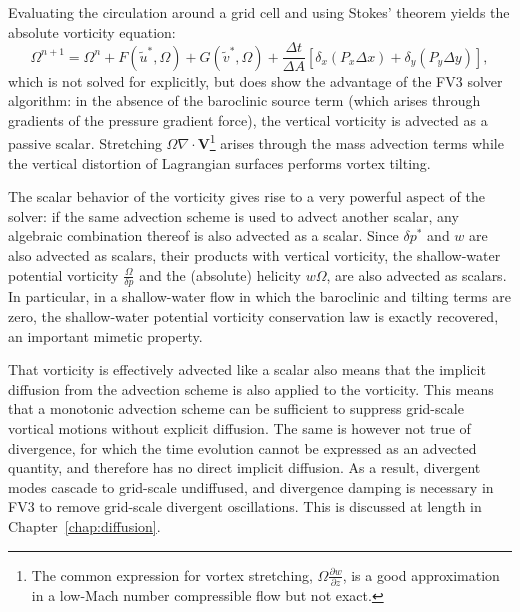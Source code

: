 \documentclass[10pt,letterpaper,margin=1in]{memoir}
\newcommand{\redtext}[1]{\textcolor{red}{[#1]}}  %
\begin{document}
Evaluating the circulation around a grid cell and using Stokes' theorem yields the absolute vorticity equation:
\begin{equation} \label{eqn:vorteqn}
\Omega^{n+1} = \Omega^n + F(\widetilde{u}^*, \Omega) + G(\widetilde{v}^*, \Omega) +  \frac{\Delta t}{\Delta A} \left [  \delta_x \left ({P_x} \Delta x \right ) +  \delta_y \left ({P_y} \Delta y \right )  \right ],
\end{equation}
which is not solved for explicitly, but does show the advantage of the FV3 solver algorithm: in the absence of the baroclinic source term  (which arises through gradients of the pressure gradient force), the vertical vorticity is advected as a passive scalar. Stretching $\Omega \nabla \cdot \mathbf{V}$\footnote{The common expression for vortex stretching, $\Omega \frac{\partial w}{\partial z}$, is a good approximation in a low-Mach number compressible flow but not exact.} arises through the mass advection terms while the vertical distortion of Lagrangian surfaces performs vortex tilting.

The scalar behavior of the vorticity gives rise to a very powerful aspect of the solver: if the same advection scheme is used to advect another scalar, any algebraic combination thereof is also advected as a scalar. Since $\delta p^*$ and $w$ are also advected as scalars, their products with vertical vorticity, the shallow-water potential vorticity  $\frac{\Omega}{\delta p}$ and the (absolute) helicity $w\Omega$, are also advected as scalars. In particular, in a shallow-water flow in which the baroclinic and tilting terms are zero, the shallow-water potential vorticity conservation law is exactly recovered, an important mimetic property. %

That vorticity is effectively advected like a scalar also means that the implicit diffusion from the advection scheme is also applied to the vorticity. This means that a monotonic advection scheme can be sufficient to suppress grid-scale vortical motions without explicit diffusion. The same is however not true of divergence, for which the time evolution cannot be expressed as an advected quantity, and therefore has no direct implicit diffusion. As a result, divergent modes cascade to grid-scale undiffused, and divergence damping is necessary in FV3 to remove grid-scale divergent oscillations. This is discussed at length in Chapter~\ref{chap:diffusion}.
\end{document}
